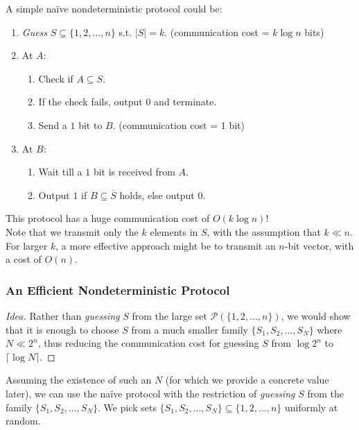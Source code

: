 \documentclass[usletter]{article}
\newcommand {\setop}[1]  {\ensuremath{\mathcal{#1}}}
\newcommand {\powerset}  {\setop{P}}
\newcommand {\bigO}     {\ensuremath{O}}
\newcommand {\range}[2]  {\ensuremath{\{#1{1},#1{2},\ldots,#1{#2}\}}}
\begin{document}
A simple na\"{i}ve nondeterministic protocol could be:
\begin{enumerate}
  \item \textit{Guess} $S \subseteq \range{}{n}$ s.t. $|S| = k$. \hfill (communication cost = $k \log{n}$ bits)
  \item At $A$:
    \begin{enumerate}
        \item Check if $A \subseteq S$.
        \item If the check fails, output $0$ and terminate.
        \item Send a $1$ bit to $B$. \hfill (communication cost = $1$ bit)
    \end{enumerate}
  \item At $B$:
    \begin{enumerate}
        \item Wait till a $1$ bit is received from $A$.
        \item Output $1$ if $B \subseteq \overline{S}$ holds, else output $0$.
    \end{enumerate}
\end{enumerate}
This protocol has a huge communication cost of $\bigO(k \log{n})$! \\
Note that we transmit only the $k$ elements in $S$, with the assumption that $k \ll n$. For larger $k$, a more effective approach might be to transmit an $n$-bit vector, with a cost of $\bigO(n)$.

\subsubsection*{An Efficient Nondeterministic Protocol}

\begin{proof}[Idea]
Rather than \textit{guessing} $S$ from the large set $\powerset(\range{}{n})$, we would show that it is enough to choose $S$ from a much smaller family $\range{S_}{N}$ where $N \ll 2^n$, thus reducing the communication cost for guessing $S$ from $\log{2^{n}}$ to $\lceil \log{N} \rceil$.
\end{proof}

\noindent
Assuming the existence of such an $N$ (for which we provide a concrete value later), we can use the na\"{i}ve protocol with the restriction of \textit{guessing} $S$ from the family $\range{S_}{N}$. We pick sets $\range{S_}{N} \subseteq \range{}{n}$ uniformly at random. \\
\end{document}
